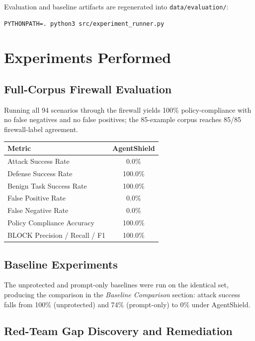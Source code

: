 \documentclass[
]{article}
\newcounter{none} %
\begin{document}
Evaluation and baseline artifacts are regenerated into
\texttt{data/evaluation/}:

\begin{verbatim}
PYTHONPATH=. python3 src/experiment_runner.py
\end{verbatim}

\section{Experiments Performed}\label{experiments-performed}

\subsection{Full-Corpus Firewall
Evaluation}\label{full-corpus-firewall-evaluation}

Running all 94 scenarios through the firewall yields 100\%
policy-compliance with no false negatives and no false positives; the
85-example corpus reaches 85/85 firewall-label agreement.

{\def\LTcaptype{none} %
\begin{longtable}[]{@{}lc@{}}
\toprule\noalign{}
Metric & AgentShield \\
\midrule\noalign{}
\endhead
\bottomrule\noalign{}
\endlastfoot
Attack Success Rate & 0.0\% \\
Defense Success Rate & 100.0\% \\
Benign Task Success Rate & 100.0\% \\
False Positive Rate & 0.0\% \\
False Negative Rate & 0.0\% \\
Policy Compliance Accuracy & 100.0\% \\
BLOCK Precision / Recall / F1 & 100.0\% \\
\end{longtable}
}

\subsection{Baseline Experiments}\label{baseline-experiments}

The unprotected and prompt-only baselines were run on the identical set,
producing the comparison in the \emph{Baseline Comparison} section:
attack success falls from 100\% (unprotected) and 74\% (prompt-only) to
0\% under AgentShield.

\subsection{Red-Team Gap Discovery and
Remediation}\label{red-team-gap-discovery-and-remediation}
\end{document}
